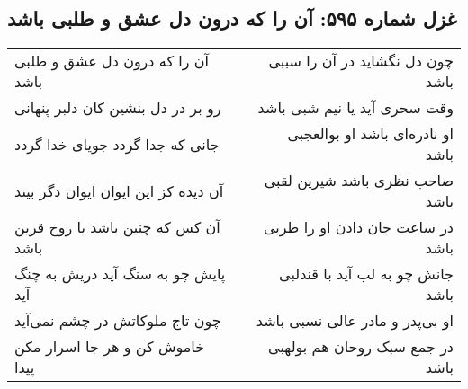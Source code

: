 \begin{center}
\section*{غزل شماره ۵۹۵: آن را که درون دل عشق و طلبی باشد}
\label{sec:0595}
\begin{longtable}{l p{0.5cm} r}
آن را که درون دل عشق و طلبی باشد
&&
چون دل نگشاید در آن را سببی باشد
\\
رو بر در دل بنشین کان دلبر پنهانی
&&
وقت سحری آید یا نیم شبی باشد
\\
جانی که جدا گردد جویای خدا گردد
&&
او نادره‌ای باشد او بوالعجبی باشد
\\
آن دیده کز این ایوان ایوان دگر بیند
&&
صاحب نظری باشد شیرین لقبی باشد
\\
آن کس که چنین باشد با روح قرین باشد
&&
در ساعت جان دادن او را طربی باشد
\\
پایش چو به سنگ آید دریش به چنگ آید
&&
جانش چو به لب آید با قندلبی باشد
\\
چون تاج ملوکاتش در چشم نمی‌آید
&&
او بی‌پدر و مادر عالی نسبی باشد
\\
خاموش کن و هر جا اسرار مکن پیدا
&&
در جمع سبک روحان هم بولهبی باشد
\\
\end{longtable}
\end{center}
